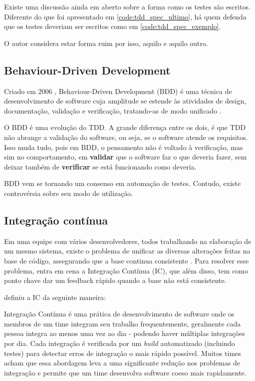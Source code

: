 Existe uma discussão ainda em aberto sobre a forma como os testes são escritos. Diferente do que foi apresentado em \ref{code:tdd_spec_ultimo}, há quem defenda que os testes deveriam ser escritos como em \ref{code:tdd_spec_exemplo}.

O autor considera estar forma ruim por isso, aquilo e aquilo outro.


\subsection{Behaviour-Driven Development}

Criado em 2006 \cite{IntroducingBDD}, Behaviour-Driven Development (BDD) é uma técnica de desenvolvimento de software cuja amplitude se estende às atividades de design, documentação, validação e verificação, tratando-as de modo unificado \cite{BDDRodrigo}.

O BDD é uma evolução do TDD. A grande diferença entre os dois, é que TDD não abrange a validação do software, ou seja, se o software atende os requisitos. Isso muda tudo, pois em BDD, o pensamento não é voltado à verificação, mas sim no comportamento, em \textbf{validar} que o software faz o que deveria fazer, sem deixar também de \textbf{verificar} se está funcionando como deveria.

BDD vem se tornando um consenso em automação de testes. Contudo, existe controvérsia sobre seu modo de utilização.


\subsection{Integração contínua}

Em uma equipe com vários desenvolvedores, todos trabalhando na elaboração de um mesmo sistema, existe o problema de unificar as diversas alterações feitas na base de código, assegurando que a base continua consistente \cite{ImproveitCI}. Para resolver esse problema, entra em cena a Integração Contínua (IC), que além disso, tem como ponto chave dar um feedback rápido quando a base não está consistente.

\cite{FowlerCI} definiu a IC da seguinte maneira:

\begin{citacao}
Integração Contínua é uma prática de desenvolvimento de software onde os membros de um time integram seu trabalho frequentemente, geralmente cada pessoa integra ao menos uma vez ao dia - podendo haver múltiplas integrações por dia. Cada integração é verificada por um \textit{build} automatizado (incluindo testes) para detectar erros de integração o mais rápido possível. Muitos times acham que essa abordagem leva a uma significante redução nos problemas de integração e permite que um time desenvolva software coeso mais rapidamente.
\end{citacao}

